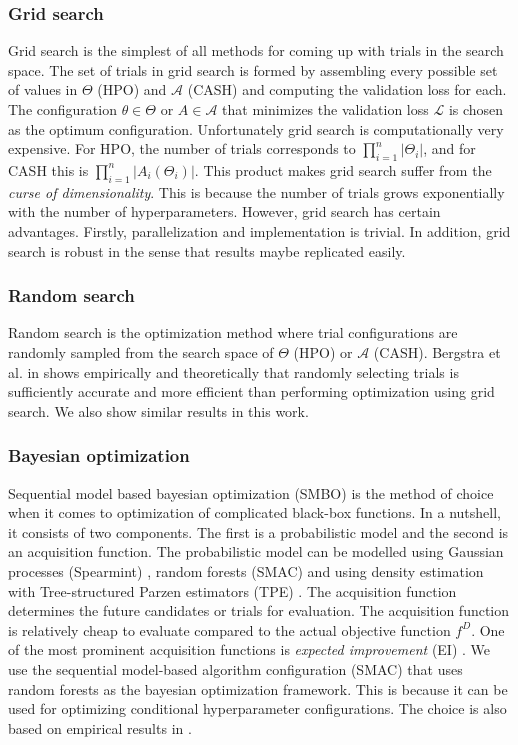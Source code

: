\subsubsection{Grid search}
\label{grid}
Grid search is the simplest of all methods for coming up with trials in the search space. The set of trials in grid search is formed by assembling every possible set of values in $\Theta$ (HPO) and $\mathcal{A}$ (CASH) and computing the validation loss for each. The configuration $\theta \in \Theta$ or $A \in \mathcal{A}$ that minimizes the validation loss $\mathcal{L}$ is chosen as the optimum configuration. Unfortunately grid search is computationally very expensive. For HPO, the number of trials corresponds to $\prod_{i=1}^n |\Theta_i|$, and for CASH this is $\prod_{i=1}^n |A_i(\Theta_i)|$. This product makes grid search suffer from the \textit{curse of dimensionality}. This is because the number of trials grows exponentially with the number of hyperparameters. However, grid search has certain advantages. Firstly, parallelization and implementation is trivial. In addition, grid search is robust in the sense that results maybe replicated easily. 

\subsubsection{Random search}
\label{random}
Random search is the optimization method where trial configurations are randomly sampled from the search space of $\Theta$ (HPO) or $\mathcal{A}$ (CASH). Bergstra et al. in \cite{bergstra2012random} shows empirically and theoretically that randomly selecting trials is sufficiently accurate and more efficient than performing optimization using grid search. We also show similar results in this work.

\subsubsection{Bayesian optimization}
\label{bayesian}
Sequential model based bayesian optimization (SMBO) \cite{hutter2011sequential} is the method of choice when it comes to optimization of complicated black-box functions. In a nutshell, it consists of two components. The first is a probabilistic model and the second is an acquisition function. The probabilistic model can be modelled using Gaussian processes (Spearmint) \cite{snoek2012practical}, random forests (SMAC) \cite{hutter2011sequential} and using density estimation with Tree-structured Parzen estimators (TPE) \cite{bergstra2011algorithms}. The acquisition function determines the future candidates or trials for evaluation. The acquisition function is relatively cheap to evaluate compared to the actual objective function $f^D$. One of the most prominent acquisition functions is \textit{expected improvement} (EI) \cite{expected_improvement}. We use the sequential model-based algorithm configuration (SMAC) that uses random forests as the bayesian optimization framework. This is because it can be used for optimizing conditional hyperparameter configurations. The choice is also based on empirical results in \cite{eggensperger2013towards}.

